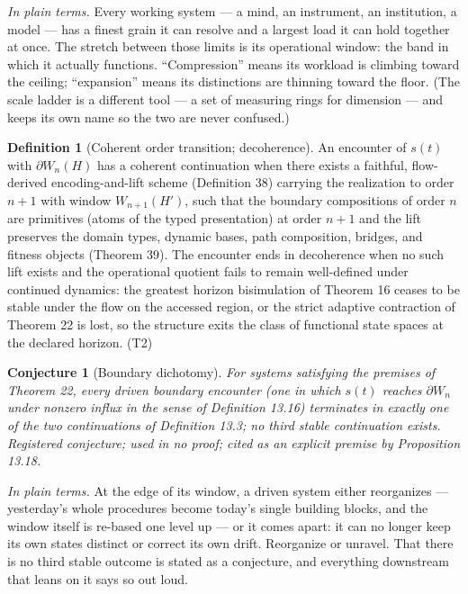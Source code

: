 \documentclass[11pt]{article}
\newtheorem{conjecture}{Conjecture}
\theoremstyle{definition}
\newtheorem{definition}{Definition}
\newcommand{\plainterms}{\emph{In plain terms.}}
\begin{document}
\noindent\plainterms{} Every working system --- a mind, an instrument, an institution, a model --- has a finest grain it can resolve and a largest load it can hold together at once. The stretch between those limits is its operational window: the band in which it actually functions. ``Compression'' means its workload is climbing toward the ceiling; ``expansion'' means its distinctions are thinning toward the floor. (The scale ladder is a different tool --- a set of measuring rings for dimension --- and keeps its own name so the two are never confused.)

\begin{definition}[Coherent order transition; decoherence]
An encounter of $s(t)$ with $\partial W_n(H)$ has a coherent continuation when there exists a faithful, flow-derived encoding-and-lift scheme (Definition 38) carrying the realization to order $n+1$ with window $W_{n+1}(H')$, such that the boundary compositions of order $n$ are primitives (atoms of the typed presentation) at order $n+1$ and the lift preserves the domain types, dynamic bases, path composition, bridges, and fitness objects (Theorem 39). The encounter ends in decoherence when no such lift exists and the operational quotient fails to remain well-defined under continued dynamics: the greatest horizon bisimulation of Theorem 16 ceases to be stable under the flow on the accessed region, or the strict adaptive contraction of Theorem 22 is lost, so the structure exits the class of functional state spaces at the declared horizon. (T2)
\end{definition}

\begin{conjecture}[Boundary dichotomy]
For systems satisfying the premises of Theorem 22, every driven boundary encounter (one in which $s(t)$ reaches $\partial W_n$ under nonzero influx in the sense of Definition 13.16) terminates in exactly one of the two continuations of Definition 13.3; no third stable continuation exists. Registered conjecture; used in no proof; cited as an explicit premise by Proposition 13.18.
\end{conjecture}

\noindent\plainterms{} At the edge of its window, a driven system either reorganizes --- yesterday's whole procedures become today's single building blocks, and the window itself is re-based one level up --- or it comes apart: it can no longer keep its own states distinct or correct its own drift. Reorganize or unravel. That there is no third stable outcome is stated as a conjecture, and everything downstream that leans on it says so out loud.
\end{document}
